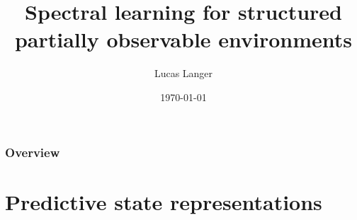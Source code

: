 \documentclass{beamer}
\title[Spectral learning with structure]{Spectral learning for structured partially observable environments} %
\author{Lucas Langer} %
\institute[McGill University] %
{
Supervisors: Borja Balle, Doina Precup \\
\medskip
}
\date{\today} %
\begin{document}
\begin{frame}
\titlepage %
\end{frame}

\begin{frame}
\frametitle{Overview} %
\tableofcontents %
\end{frame}


\section{Predictive state representations} %



\end{document}
